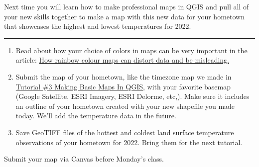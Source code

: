 \documentclass[oneside,a4paper,11pt,explicit]{book}
\begin{document}
	\begin{tcolorbox}[colback=gray!5!white,colframe=blue!65!green,title=Next Tutorial]
		Next time you will learn how to make professional maps in QGIS and pull all of your new skills together to make a map with this new data for your hometown that showcases the highest and lowest temperatures for 2022. 
	\end{tcolorbox}
	
	
	
	\vspace{.25em}
	
	\hrule
	
	\vspace{1 em}
	
	\begin{tcolorbox}[colback=yellow!5!white,colframe=red!80!blue,title= \vspace{.2em} \Large Map of the Week Assignments]
		\large
		\begin{enumerate}
			\item Read about how your choice of colors in maps can be very important in the article: \href{https://theconversation.com/how-rainbow-colour-maps-can-distort-data-and-be-misleading-167159}{How rainbow colour maps can distort data and be misleading.}
			\item Submit the map of your hometown, like the timezone map we made in \href{https://jeremydforsythe.github.io/icecream-tutorials/Tutorial3_MakingBasicMapsInQGIS/Tutorial3_MakingBasicMapsInQGIS.pdf}{Tutorial \#3 Making Basic Maps In QGIS}, with your favorite basemap (Google Satellite, ESRI Imagery, ESRI Delorme, etc,). Make sure it includes an outline of your hometown created with your new shapefile you made today. We'll add the temperature data in the future.  
			\item Save GeoTIFF files of the hottest and coldest land surface temperature observations of your hometown for 2022. Bring them for the next tutorial.
		\end{enumerate}
		
		Submit your map via Canvas before Monday's class.
	\end{tcolorbox}
	
\end{document}
